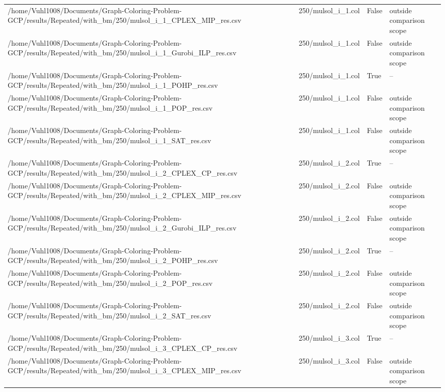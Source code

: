 \begin{table}[htbp]
\begin{tabular}{llll}
/home/Vuhl1008/Documents/Graph-Coloring-Problem-GCP/results/Repeated/with\_bm/250/mulsol\_i\_1\_CPLEX\_MIP\_res.csv & 250/mulsol\_i\_1.col & False & outside comparison scope \\
/home/Vuhl1008/Documents/Graph-Coloring-Problem-GCP/results/Repeated/with\_bm/250/mulsol\_i\_1\_Gurobi\_ILP\_res.csv & 250/mulsol\_i\_1.col & False & outside comparison scope \\
/home/Vuhl1008/Documents/Graph-Coloring-Problem-GCP/results/Repeated/with\_bm/250/mulsol\_i\_1\_POHP\_res.csv & 250/mulsol\_i\_1.col & True & -- \\
/home/Vuhl1008/Documents/Graph-Coloring-Problem-GCP/results/Repeated/with\_bm/250/mulsol\_i\_1\_POP\_res.csv & 250/mulsol\_i\_1.col & False & outside comparison scope \\
/home/Vuhl1008/Documents/Graph-Coloring-Problem-GCP/results/Repeated/with\_bm/250/mulsol\_i\_1\_SAT\_res.csv & 250/mulsol\_i\_1.col & False & outside comparison scope \\
/home/Vuhl1008/Documents/Graph-Coloring-Problem-GCP/results/Repeated/with\_bm/250/mulsol\_i\_2\_CPLEX\_CP\_res.csv & 250/mulsol\_i\_2.col & True & -- \\
/home/Vuhl1008/Documents/Graph-Coloring-Problem-GCP/results/Repeated/with\_bm/250/mulsol\_i\_2\_CPLEX\_MIP\_res.csv & 250/mulsol\_i\_2.col & False & outside comparison scope \\
/home/Vuhl1008/Documents/Graph-Coloring-Problem-GCP/results/Repeated/with\_bm/250/mulsol\_i\_2\_Gurobi\_ILP\_res.csv & 250/mulsol\_i\_2.col & False & outside comparison scope \\
/home/Vuhl1008/Documents/Graph-Coloring-Problem-GCP/results/Repeated/with\_bm/250/mulsol\_i\_2\_POHP\_res.csv & 250/mulsol\_i\_2.col & True & -- \\
/home/Vuhl1008/Documents/Graph-Coloring-Problem-GCP/results/Repeated/with\_bm/250/mulsol\_i\_2\_POP\_res.csv & 250/mulsol\_i\_2.col & False & outside comparison scope \\
/home/Vuhl1008/Documents/Graph-Coloring-Problem-GCP/results/Repeated/with\_bm/250/mulsol\_i\_2\_SAT\_res.csv & 250/mulsol\_i\_2.col & False & outside comparison scope \\
/home/Vuhl1008/Documents/Graph-Coloring-Problem-GCP/results/Repeated/with\_bm/250/mulsol\_i\_3\_CPLEX\_CP\_res.csv & 250/mulsol\_i\_3.col & True & -- \\
/home/Vuhl1008/Documents/Graph-Coloring-Problem-GCP/results/Repeated/with\_bm/250/mulsol\_i\_3\_CPLEX\_MIP\_res.csv & 250/mulsol\_i\_3.col & False & outside comparison scope \\

\end{tabular}
\end{table}
